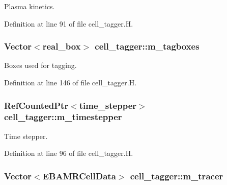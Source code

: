 Plasma kinetics. 



Definition at line 91 of file cell\+\_\+tagger.\+H.

\subsubsection[{\texorpdfstring{m\+\_\+tagboxes}{m_tagboxes}}]{\setlength{\rightskip}{0pt plus 5cm}Vector$<${\bf real\+\_\+box}$>$ cell\+\_\+tagger\+::m\+\_\+tagboxes\hspace{0.3cm}{\ttfamily [protected]}}\hypertarget{classcell__tagger_a3f66147925775902886212b74e51c3d2}{}\label{classcell__tagger_a3f66147925775902886212b74e51c3d2}


Boxes used for tagging. 



Definition at line 146 of file cell\+\_\+tagger.\+H.

\subsubsection[{\texorpdfstring{m\+\_\+timestepper}{m_timestepper}}]{\setlength{\rightskip}{0pt plus 5cm}Ref\+Counted\+Ptr$<${\bf time\+\_\+stepper}$>$ cell\+\_\+tagger\+::m\+\_\+timestepper\hspace{0.3cm}{\ttfamily [protected]}}\hypertarget{classcell__tagger_a6cb59731dd7aee8369318cfe5fb6823a}{}\label{classcell__tagger_a6cb59731dd7aee8369318cfe5fb6823a}


Time stepper. 



Definition at line 96 of file cell\+\_\+tagger.\+H.

\subsubsection[{\texorpdfstring{m\+\_\+tracer}{m_tracer}}]{\setlength{\rightskip}{0pt plus 5cm}Vector$<${\bf E\+B\+A\+M\+R\+Cell\+Data}$>$ cell\+\_\+tagger\+::m\+\_\+tracer\hspace{0.3cm}{\ttfamily [protected]}}\hypertarget{classcell__tagger_a09cfda8cf8ca974f39a56ce5ab5e1829}{}\label{classcell__tagger_a09cfda8cf8ca974f39a56ce5ab5e1829}


